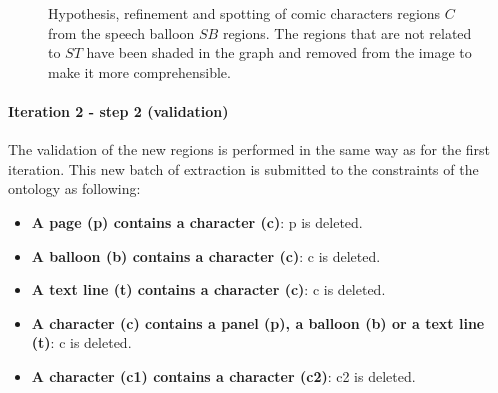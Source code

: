 \begin{figure}[!ht]
  \caption[Hypothesis, refinement and spotting of comic character regions from the speech balloon regions]{Hypothesis, refinement and spotting of comic characters regions $C$ from the speech balloon $SB$ regions. The regions that are not related to $ST$ have been shaded in the graph and removed from the image to make it more comprehensible.
  }
  \label{fig:kn:graph_character_region}
 \end{figure}



\paragraph{Iteration 2 - step 2 (validation)} %
\label{par:step_5}

The validation of the new regions is performed in the same way as for the first iteration.
This new batch of extraction is submitted to the constraints of the ontology as following:

\begin{itemize}
  \item \textbf{A page (p) contains a character (c)}: p is deleted.
  \item \textbf{A balloon (b) contains a character (c)}: c is deleted.
  \item \textbf{A text line (t) contains a character (c)}: c is deleted.
  \item \textbf{A character (c) contains a panel (p), a balloon (b) or a text line (t)}: c is deleted.  
  \item \textbf{A character (c1) contains a character (c2)}: c2 is deleted.
\end{itemize}
  
